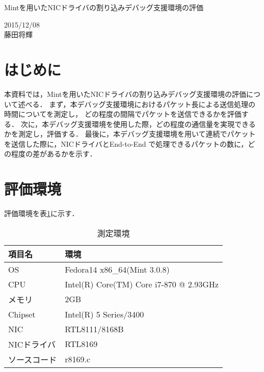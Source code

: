 \documentclass[12pt]{jsarticle}
\begin{document}

\begin{center}
    {\LARGE Mintを用いたNICドライバの割り込みデバッグ支援環境の評価}
\end{center}

\begin{flushright}
    2015/12/08\\
    藤田将輝
\end{flushright}
\section{はじめに}
本資料では，Mintを用いたNICドライバの割り込みデバッグ支援環境の評価について述べる．
まず，本デバッグ支援環境におけるパケット長による送信処理の時間についてを測定し，
どの程度の間隔でパケットを送信できるかを評価する．
次に，本デバッグ支援環境を使用した際，どの程度の通信量を実現できるかを測定し，評価する．
最後に，本デバッグ支援環境を用いて連続でパケットを送信した際に，NICドライバとEnd-to-End
で処理できるパケットの数に，どの程度の差があるかを示す．

\section{評価環境}

評価環境を表\ref{environment}に示す．

\begin{table}[h]
    \caption{測定環境}
    \label{environment}
    \begin{center}
        \begin{tabular}{l|l}   \hline \hline 
            項目名      & 環境                                    \\ \hline
            OS          & Fedora14 x86\_64(Mint 3.0.8)            \\ 
            CPU         & Intel(R) Core(TM) Core i7-870 @ 2.93GHz \\
            メモリ      & 2GB                                     \\
            Chipset     & Intel(R) 5 Series/3400                  \\
            NIC         & RTL8111/8168B                           \\
            NICドライバ & RTL8169                                 \\ 
            ソースコード& r8169.c                                 \\ \hline
        \end{tabular}
    \end{center}
\end{table}
\end{document}
